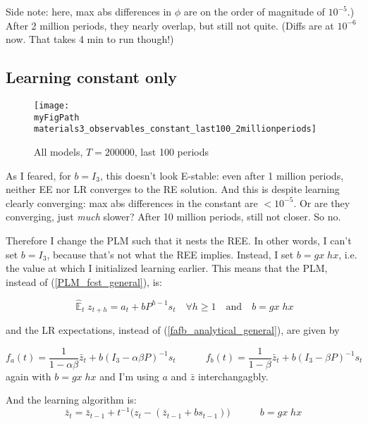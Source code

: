 \documentclass[11pt]{article}
\def \myFigPath {../figures/}
\renewcommand{\[}{\begin{equation}}
\renewcommand{\]}{\end{equation}}
\DeclareMathOperator{\E}{\mathbb{E}}
\def\myFigScale{0.3}
\begin{document}
Side note: here, max abs differences in $\phi$ are on the order of magnitude of $10^{-5}$.) After 2 million periods, they nearly overlap, but still not quite. (Diffs are at $10^{-6}$ now. That takes 4 min to run though!)

\subsection{Learning constant only}

 \begin{figure}[h!]
\texttt{[image: \\myFigPath materials3\_observables\_constant\_last100\_2millionperiods]}
\caption{All models, $T = 200000$, last 100 periods}
\end{figure}
 
 As I feared, for $b=I_3$, this doesn't look E-stable: even after 1 million periods, neither EE nor LR converges to the RE solution. And this is despite learning clearly converging: max abs differences in the constant are $<10^{-5}$. Or are they converging, just \emph{much} slower? After 10 million periods, still not closer. So no.
 
Therefore I change the PLM such that it nests the REE. In other words, I can't set $b = I_3$, because that's not what the REE implies. Instead, I set $b=gx\;hx$, i.e. the value at which I initialized learning earlier. This means that the PLM, instead of (\ref{PLM_fcst_general}), is:
 
 \begin{equation}
\hat{\E}_t z_{t+h} = a_{t} + bP^{h-1}s_t  \quad \forall h\geq 1 \quad \text{and} \quad b=gx \; hx \label{PLM_fcst_constant}
\end{equation}
 
 and the LR expectations, instead of (\ref{fafb_analytical_general}), are given by
 
 \begin{equation}
f_a(t) = \frac{1}{1-\alpha\beta}\bar{z}_{t}  + b(I_3 - \alpha\beta P)^{-1}s_t \quad \quad \quad f_b(t) = \frac{1}{1-\beta}\bar{z}_{t}  + b(I_3 - \beta P)^{-1}s_t  \label{fafb_analytical_constant}
\end{equation}
 again with $b= gx\;hx$ and I'm using $a$ and $\bar{z}$ interchangagbly.
 
 And the learning algorithm is:
 \begin{equation}
\bar{z}_{t} = \bar{z}_{t-1} +t^{-1}\big(z_{t} -(\bar{z}_{t-1}+bs_{t-1}) \big) \quad  \quad \quad b= gx\;hx \label{RLS_constant}
\end{equation}
 
\end{document}
